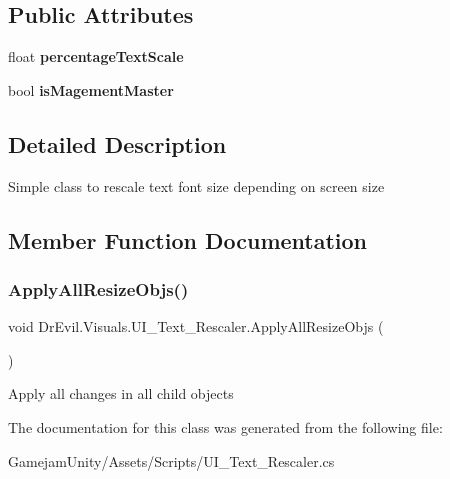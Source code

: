 \subsection*{Public Attributes}
\begin{DoxyCompactItemize}
\item 
\mbox{\label{class_dr_evil_1_1_visuals_1_1_u_i___text___rescaler_aefdb2e3c8f038b07fbc8611d34adf0c6}} 
float {\bfseries percentage\+Text\+Scale}
\item 
\mbox{\label{class_dr_evil_1_1_visuals_1_1_u_i___text___rescaler_afeedadaa509e9943afaf474760966fb2}} 
bool {\bfseries is\+Magement\+Master}
\end{DoxyCompactItemize}


\subsection{Detailed Description}
Simple class to rescale text font size depending on screen size 



\subsection{Member Function Documentation}
\mbox{\label{class_dr_evil_1_1_visuals_1_1_u_i___text___rescaler_a28595219a5b1654f56d4ad4b5a9ef663}} 
\subsubsection{\texorpdfstring{Apply\+All\+Resize\+Objs()}{ApplyAllResizeObjs()}}
{\footnotesize\ttfamily void Dr\+Evil.\+Visuals.\+U\+I\+\_\+\+Text\+\_\+\+Rescaler.\+Apply\+All\+Resize\+Objs (\begin{DoxyParamCaption}{ }\end{DoxyParamCaption})\hspace{0.3cm}{\ttfamily [inline]}}



Apply all changes in all child objects 



The documentation for this class was generated from the following file\+:\begin{DoxyCompactItemize}
\item 
Gamejam\+Unity/\+Assets/\+Scripts/U\+I\+\_\+\+Text\+\_\+\+Rescaler.\+cs\end{DoxyCompactItemize}
